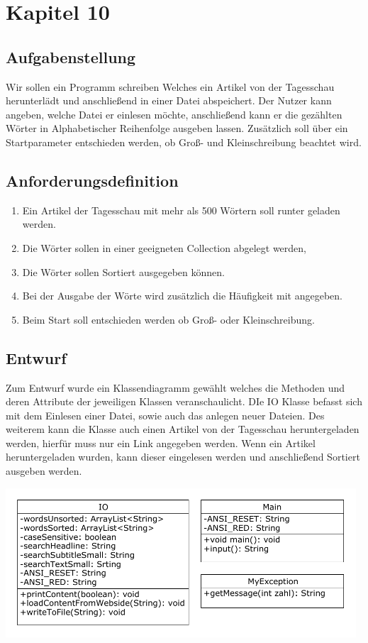\section{Kapitel 10}
\subsection{Aufgabenstellung}
Wir sollen ein Programm schreiben Welches ein Artikel von der Tagesschau herunterlädt und
anschlie\ss end in einer Datei abspeichert. Der Nutzer kann angeben, welche Datei er einlesen möchte,
anschlie\ss end kann er die gezählten Wörter in Alphabetischer Reihenfolge ausgeben lassen.
Zusätzlich soll über ein Startparameter entschieden werden, ob Gro\ss -  und Kleinschreibung
beachtet wird.

\subsection{Anforderungsdefinition}
\begin{enumerate}
	\item Ein Artikel der Tagesschau mit mehr als 500 Wörtern soll runter geladen werden.
	\item Die Wörter sollen in einer geeigneten Collection abgelegt werden,
	\item Die Wörter sollen Sortiert ausgegeben können.
	\item Bei der Ausgabe der Wörte wird zusätzlich die Häufigkeit mit angegeben.
	\item Beim Start soll entschieden werden ob Gro\ss - oder Kleinschreibung.
\end{enumerate}

\subsection{Entwurf}
Zum Entwurf wurde ein Klassendiagramm gewählt welches die Methoden und deren Attribute der
jeweiligen Klassen veranschaulicht. DIe IO Klasse befasst sich mit dem Einlesen einer Datei, sowie auch
das anlegen neuer Dateien. Des weiterem kann die Klasse auch einen Artikel von der Tagesschau heruntergeladen werden, hierfür muss nur ein Link angegeben werden. Wenn ein Artikel heruntergeladen
wurden, kann dieser eingelesen werden und anschlie\ss end Sortiert ausgeben werden.
\begin{center}
	\includegraphics[width=0.98\textwidth]{uml/uml_c10_p1.pdf}
\end{center}

